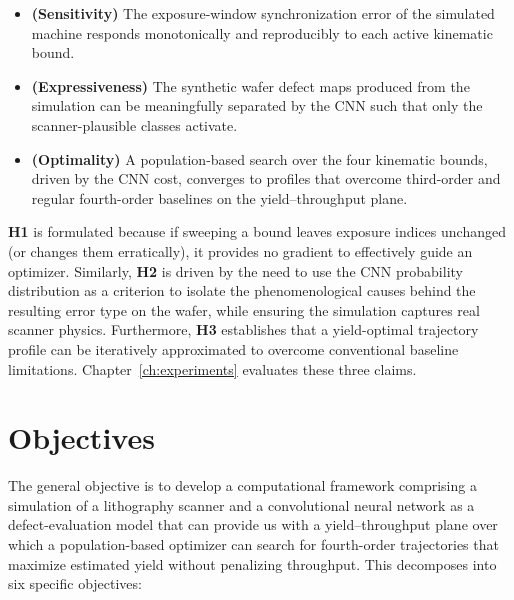 \begin{itemize}
    \item[\textbf{H1}] \textbf{(Sensitivity)} The exposure-window synchronization error of the simulated machine responds monotonically and reproducibly to each active kinematic bound.
    \item[\textbf{H2}] \textbf{(Expressiveness)} The synthetic wafer defect maps produced from the simulation can be meaningfully separated by the CNN such that only the scanner-plausible classes activate.
    \item[\textbf{H3}] \textbf{(Optimality)} A population-based search over the four kinematic bounds, driven by the CNN cost, converges to profiles that overcome third-order and regular fourth-order baselines on the yield--throughput plane.
\end{itemize}

\textbf{H1} is formulated because if sweeping a bound leaves exposure indices unchanged (or changes them erratically), it provides no gradient to effectively guide an optimizer. Similarly, \textbf{H2} is driven by the need to use the CNN probability distribution as a criterion to isolate the phenomenological causes behind the resulting error type on the wafer, while ensuring the simulation captures real scanner physics. Furthermore, \textbf{H3} establishes that a yield-optimal trajectory profile can be iteratively approximated to overcome conventional baseline limitations. Chapter~\ref{ch:experiments} evaluates these three claims.

\section{Objectives}\label{sec:intro_objectives}

The general objective is to develop a computational framework comprising a simulation of a lithography scanner and a convolutional neural network as a defect-evaluation model that can provide us with a yield--throughput plane over which a population-based optimizer can search for fourth-order trajectories that maximize estimated yield without penalizing throughput. This decomposes into six specific objectives:

